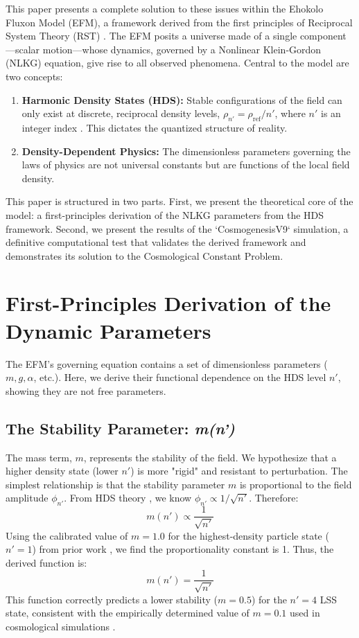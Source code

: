 \documentclass[11pt, twoside]{article}
\begin{document}
This paper presents a complete solution to these issues within the Ehokolo Fluxon Model (EFM), a framework derived from the first principles of Reciprocal System Theory (RST) \citep{larson1959}. The EFM posits a universe made of a single component—scalar motion—whose dynamics, governed by a Nonlinear Klein-Gordon (NLKG) equation, give rise to all observed phenomena. Central to the model are two concepts:
\begin{enumerate}
    \item \textbf{Harmonic Density States (HDS):} Stable configurations of the field can only exist at discrete, reciprocal density levels, \(\rho_{n'} = \rho_{\text{ref}}/n'\), where \(n'\) is an integer index \citep{emvula2025hds}. This dictates the quantized structure of reality.
    \item \textbf{Density-Dependent Physics:} The dimensionless parameters governing the laws of physics are not universal constants but are functions of the local field density.
\end{enumerate}
This paper is structured in two parts. First, we present the theoretical core of the model: a first-principles derivation of the NLKG parameters from the HDS framework. Second, we present the results of the `CosmogenesisV9` simulation, a definitive computational test that validates the derived framework and demonstrates its solution to the Cosmological Constant Problem.

\section{First-Principles Derivation of the Dynamic Parameters}
The EFM's governing equation contains a set of dimensionless parameters (\(m, g, \alpha\), etc.). Here, we derive their functional dependence on the HDS level \(n'\), showing they are not free parameters.

\subsection{The Stability Parameter: \textit{m(n')}}
The mass term, \(m\), represents the stability of the field. We hypothesize that a higher density state (lower \(n'\)) is more "rigid" and resistant to perturbation. The simplest relationship is that the stability parameter \(m\) is proportional to the field amplitude \(\phi_{n'}\). From HDS theory \citep{emvula2025hds}, we know \(\phi_{n'} \propto 1/\sqrt{n'}\). Therefore:
\begin{equation}
m(n') \propto \frac{1}{\sqrt{n'}}
\end{equation}
Using the calibrated value of \(m=1.0\) for the highest-density particle state (\(n'=1\)) from prior work \citep{EFMmassgen}, we find the proportionality constant is 1. Thus, the derived function is:
\begin{equation}
m(n') = \frac{1}{\sqrt{n'}}
\end{equation}
This function correctly predicts a lower stability (\(m=0.5\)) for the \(n'=4\) LSS state, consistent with the empirically determined value of \(m=0.1\) used in cosmological simulations \citep{EFMDimensionlessPaper}.
\end{document}
